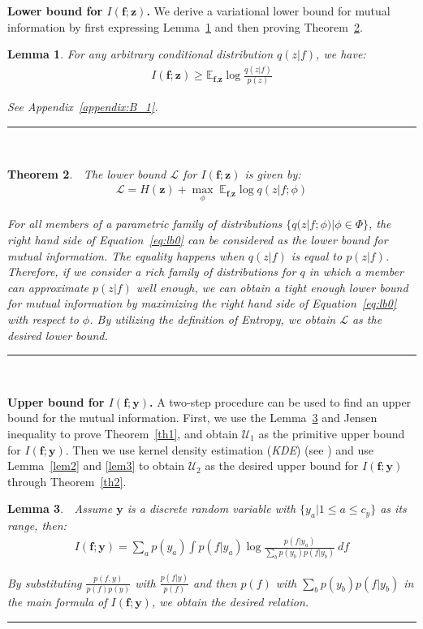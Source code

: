 \documentclass[10pt,journal,compsoc]{IEEEtran}
\newcommand{\BlackBox}{\rule{1.5ex}{1.5ex}}  %
\newenvironment{proof}{\par\noindent{\bf Proof\ }}{\hfill\BlackBox\\[2mm]}
\newtheorem{theorem}{Theorem}
\newtheorem{lemma}[theorem]{Lemma}
\begin{document}
\textbf{Lower bound for $I(\textbf{f};\textbf{z})$.} We derive a variational lower bound for mutual information by first expressing Lemma~\ref{lem0} and then proving Theorem~\ref{th0}.
\begin{lemma}
	\label{lem0}
	For any arbitrary conditional distribution $q(z|f)$, we have:
	\begin{align}\label{eq:lb0}
	I(\textbf{f};\textbf{z}) \geq \mathds{E}_{\textbf{f},\textbf{z}} \log \frac{q(z|f)}{p(z)}
	\end{align}
	\begin{proof}
		See Appendix~\ref{appendix:B_1}.
	\end{proof}
\end{lemma}\begin{theorem} \label{th0}
	$\;$ The lower bound $\mathcal{L}$ for $I(\textbf{f};\textbf{z})$ is given by:
	\begin{align}
	\mathcal{L} =  H(\textbf{z}) + \max_{\phi}\; \mathds{E}_{\textbf{f},\textbf{z}} \log q(z|f;\phi)
	\end{align}
	\begin{proof}
		For all members of a parametric family of distributions $\{q(z|f;\phi)|\phi \in \Phi\}$, the right hand side of Equation~\ref{eq:lb0} can be considered as the lower bound for mutual information. The equality happens when $q(z|f)$ is equal to $p(z|f)$. Therefore, if we consider a rich family of distributions for $q$ in which a member can approximate $p(z|f)$ well enough, we can obtain a tight enough lower bound for mutual information by maximizing the right hand side of Equation~\ref{eq:lb0} with respect to $\phi$. By utilizing the definition of Entropy, we obtain $\mathcal{L}$ as the desired lower bound.
	\end{proof}
\end{theorem}\textbf{Upper bound for $I(\textbf{f};\textbf{y})$.} A two-step procedure can be used to find an upper bound for the mutual information. First, we use the Lemma~\ref{lem1} and Jensen inequality to prove Theorem~\ref{th1}, and obtain $\mathcal{U}_1$ as the primitive upper bound for $I(\textbf{f};\textbf{y})$. Then we use kernel density estimation (\emph{KDE}) (see \cite{bishop2006}) and use Lemma~\ref{lem2} and \ref{lem3} to obtain $\mathcal{U}_2$ as the desired upper bound for $I(\textbf{f};\textbf{y})$ through Theorem~\ref{th2}. 

\begin{lemma}
	\label{lem1}
	$\;$ Assume $\textbf{y}$ is a discrete random variable with $\{y_a|1\le a \le c_y\}$ as its range, then:
	\begin{align*}
	I(\textbf{f};\textbf{y}) = \sum_a p(y_a) \int p(f|y_a) \log \frac{p(f|y_a)}{\sum_b p(y_b)p(f|y_b)}\ df
	\end{align*} 
	\begin{proof}
		By substituting $\frac{p(f,y)}{p(f)p(y)}$ with $\frac{p(f|y)}{p(f)}$ and then $p(f)$ with $\sum_b p(y_b)p(f|y_b)$ in the main formula of $I(\textbf{f};\textbf{y})$, we obtain the desired relation.
	\end{proof}
\end{lemma}
\end{document}
